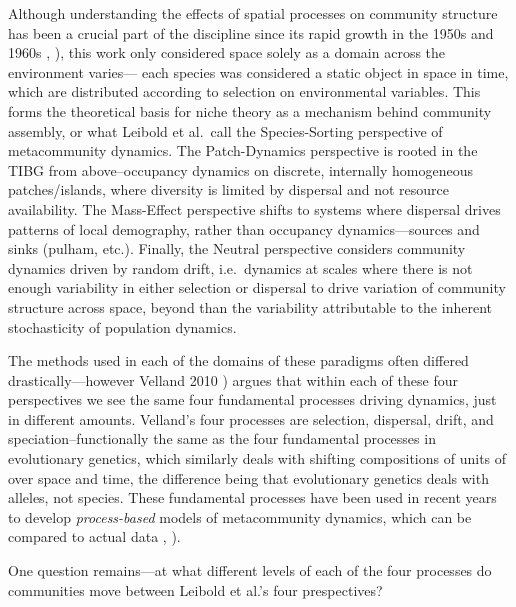 \documentclass[]{article}
\begin{document}
Although understanding the effects of spatial processes on community
structure has been a crucial part of the discipline since its rapid
growth in the 1950s and 1960s \citep{macarthur},
\citep{hutchinson}), this work only considered space solely as a
domain across the environment varies--- each species was considered a
static object in space in time, which are distributed according to
selection on environmental variables. This forms the theoretical basis
for niche theory as a mechanism behind community assembly, or what
Leibold et al.~call the Species-Sorting perspective of metacommunity
dynamics. The Patch-Dynamics perspective is rooted in the TIBG from
above--occupancy dynamics on discrete, internally homogeneous
patches/islands, where diversity is limited by dispersal and not
resource availability. The Mass-Effect perspective shifts to systems
where dispersal drives patterns of local demography, rather than
occupancy dynamics---sources and sinks (pulham, etc.). Finally, the
Neutral perspective considers community dynamics driven by random drift,
i.e.~dynamics at scales where there is not enough variability in either
selection or dispersal to drive variation of community structure across
space, beyond than the variability attributable to the inherent
stochasticity of population dynamics.

The methods used in each of the domains of these paradigms often
differed drastically---however Velland 2010 \citep{velland}) argues
that within each of these four perspectives we see the same four
fundamental processes driving dynamics, just in different amounts.
Velland's four processes are selection, dispersal, drift, and
speciation--functionally the same as the four fundamental processes in
evolutionary genetics, which similarly deals with shifting compositions
of units of over space and time, the difference being that evolutionary
genetics deals with alleles, not species. These fundamental processes
have been used in recent years to develop \emph{process-based} models of
metacommunity dynamics, which can be compared to actual data
\citep{poisot_2014}, \citep{thompson}).

One question remains---at what different levels of each of the four
processes do communities move between Leibold et al.'s four
prespectives?

\pagebreak


%
%
%
\end{document}

